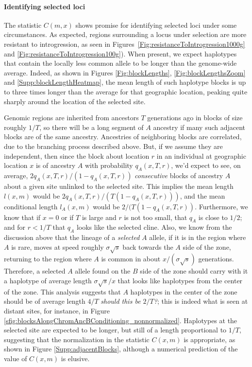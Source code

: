\documentclass[11pt,letterpaper]{article}
\newcommand{\alisa}[1]{{\em \color{red} #1}}
\begin{document}
\paragraph{Identifying selected loci}
The statistic $C(m,x)$ shows promise for identifying selected loci under some circumstances.
As expected, regions surrounding a locus under selection are more resistant to introgression,
as seen in Figures~\ref{Fig:resistanceToIntrogression1000g} and \ref{Fig:resistanceToIntrogression100g}).
When present, we expect haplotypes that contain the locally less common allele
to be longer than the genome-wide average.
Indeed,
as shown in Figures \ref{Fig:blockLengths}, \ref{Fig:blockLengthsZoom} and \ref{Supp:blockLengthHeatmap},
the mean length of such haplotype blocks is up to three times longer
than the average for that geographic location,
peaking quite sharply around the location of the selected site.

Genomic regions are inherited from ancestors $T$ generations ago
in blocks of size roughly $1/T$,
so there will be a long segment of $A$ ancestry
if many such adjacent blocks are of the same ancestry.
Ancestries of neighboring blocks are correlated,
due to the branching process described above. 
But, if we assume they are independent, 
then since the block about location $r$ in an individual at geographic location $x$ is of ancestry $A$ with probability $q_A(x,T,r)$,
we'd expect to see, on average, $2q_A(x,T,r)/(1-q_A(x,T,r))$ \alisa{consecutive} blocks of ancestry $A$ about a given site unlinked to the selected site.
This implies the mean length $l(x,m)$ would be $2q_A(x,T,r)/(T(1-q_A(x,T,r)))$,
and the mean conditional length $l_A(x,m)$ would be $2/(T(1-q_A(x,T,r))$.
Furthermore, we know that if $x=0$ or if $T$ is large and $r$ is not too small, that $q_A$ is close to $1/2$;
and for $r<1/T$ that $q_A$ looks like the selected cline.
Also, we know from the discussion above that the lineage of a \emph{selected} $A$ allele,
if it is in the region where $A$ is rare,
moves at speed roughly $\sigma \sqrt{s}$ back towards the $A$ side of the zone,
returning to the region where $A$ is common in about $x/(\sigma \sqrt{s})$ generations.
Therefore, a selected $A$ allele found on the $B$ side of the zone
should carry with it a haplotype of average length $\sigma \sqrt{s}/x$
that looks like haplotypes from the center of the zone.
This analysis suggests that $A$ haplotypes in the center of the zone should be of average length $4/T$ \alisa{should this be $2/T$?};
this is indeed what is seen at distant sites, for instance, in Figure \ref{sfig:blocksAlongChromAncBConditioning_nonnormalized}.
Haplotypes at the selected site are expected to be longer, but still of a length proportional to $1/T$,
suggesting that the normalization in the statistic $C(x,m)$ is appropriate,
as shown in Figure \ref{Supp:adjacentBlocks},
although a numerical prediction of the value of $C(x,m)$ is elusive.
\end{document}
